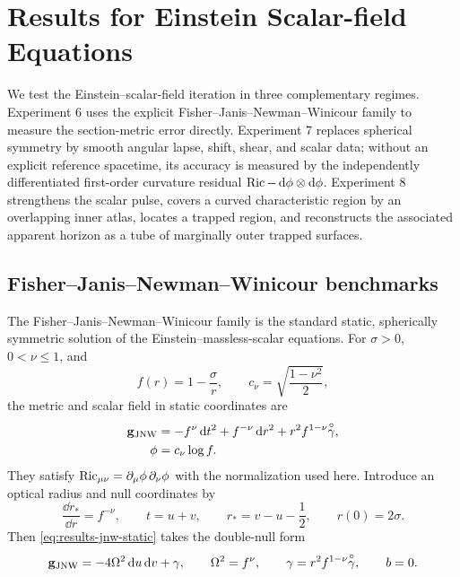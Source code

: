 \section{Results for Einstein Scalar-field Equations}

We test the Einstein--scalar-field iteration in three complementary regimes.
Experiment 6 uses the explicit Fisher--Janis--Newman--Winicour family to
measure the section-metric error directly.  Experiment 7 replaces spherical
symmetry by smooth angular lapse, shift, shear, and scalar data; without an
explicit reference spacetime, its accuracy is measured by the independently
differentiated first-order curvature residual
$\operatorname{Ric}-\mathop{}\!\mathrm d\phi\otimes\mathop{}\!\mathrm d\phi$.  Experiment 8 strengthens the scalar pulse,
covers a curved characteristic region by an overlapping inner atlas, locates
a trapped region, and reconstructs the associated apparent horizon as a tube
of marginally outer trapped surfaces.


\subsection{Fisher--Janis--Newman--Winicour benchmarks}

The Fisher--Janis--Newman--Winicour family is the standard static,
spherically symmetric solution of the Einstein--massless-scalar equations.
For $\sigma>0$, $0<\nu\leq1$, and
\begin{equation}
  f(r)=1-\frac{\sigma}{r},
  \qquad c_\nu=\sqrt{\frac{1-\nu^2}{2}},
\end{equation}
the metric and scalar field in static coordinates are
\begin{align}\label{eq:results-jnw-static}
  \mathbf g_{\mathrm{JNW}}
  &=-f^\nu\mathop{}\!\mathrm d t^2+f^{-\nu}\mathop{}\!\mathrm d r^2
    +r^2f^{1-\nu}\overset{\circ}{\gamma},\\
  \phi&=c_\nu\log f.
\end{align}
They satisfy $\operatorname{Ric}_{\mu\nu}=\partial_\mu\phi\,\partial_\nu\phi$ with the
normalization used here.  Introduce an optical radius and null coordinates by
\begin{equation}
  \frac{\dd r_*}{\dd r}=f^{-\nu},\qquad
  t=u+v,\qquad r_*=v-u-\frac12,
  \qquad r(0)=2\sigma.
\end{equation}
Then \eqref{eq:results-jnw-static} takes the double-null form
\begin{equation}\label{eq:results-jnw-double-null}
  \mathbf g_{\mathrm{JNW}}
  =-4\Omega^2\mathop{}\!\mathrm d u\mathop{}\!\mathrm d v+\gamma,\qquad
  \Omega^2=f^\nu,\qquad
  \gamma=r^2f^{1-\nu}\overset{\circ}{\gamma},\qquad b=0.
\end{equation}

